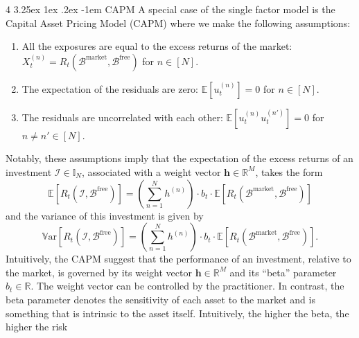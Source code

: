 \documentclass[12pt]{article}
\makeatletter
\renewcommand\paragraph{%
	\@startsection{paragraph}
	{4}
	{\z@}
	{3.25ex \@plus1ex \@minus.2ex}
	{-1em}
	{\normalfont\normalsize\bfseries\maybe@addperiod}%
}
\newcommand{\maybe@addperiod}[1]{%
	#1\@addpunct{.}%
}
\makeatother
\begin{document}
\paragraph{CAPM} A special case of the single factor model is the Capital Asset Pricing Model (CAPM) where we make the following assumptions:
\begin{enumerate}
	\item All the exposures are equal to the excess returns of the market: $X_t^{(n)} = R_t(\mathcal{B}^{\text{market}}, \mathcal{B}^{\text{free}})$ for $n \in [N]$.
	\item The expectation of the residuals are zero: $\mathbb{E}[u^{(n)}_t] = 0$ for $n \in [N]$.
	\item The residuals are uncorrelated with each other: $\mathbb{E}[u^{(n)}_t u^{(n')}_t] = 0$ for $n \neq n' \in [N]$.
\end{enumerate}
Notably, these assumptions imply that the expectation of the excess returns of an investment $\mathcal{I} \in \mathbb{I}_N$, associated with a weight vector $\mathbf{h} \in \mathbb{R}^M$, takes the form
\begin{equation}
	\mathbb{E}[R_t(\mathcal{I}, \mathcal{B}^{\text{free}})] = \left(\sum_{n=1}^N h^{(n)}\right) \cdot b_t \cdot \mathbb{E}[R_t(\mathcal{B}^{\text{market}}, \mathcal{B}^{\text{free}})]
\end{equation}
and the variance of this investment is given by
\begin{equation}
	\mathbb{V}\text{ar}[R_t(\mathcal{I}, \mathcal{B}^{\text{free}})] = \left(\sum_{n=1}^N h^{(n)}\right) \cdot b_t \cdot \mathbb{E}[R_t(\mathcal{B}^{\text{market}}, \mathcal{B}^{\text{free}})].
\end{equation}
Intuitively, the CAPM suggest that the performance of an investment, relative to the market, is governed by its weight vector $\mathbf{h} \in \mathbb{R}^M$ and its ``beta'' parameter $b_t \in \mathbb{R}$. The weight vector can be controlled by the practitioner. In contrast, the beta parameter denotes the sensitivity of each asset to the market and is something that is intrinsic to the asset itself. Intuitively, the higher the beta, the higher the risk
\end{document}
